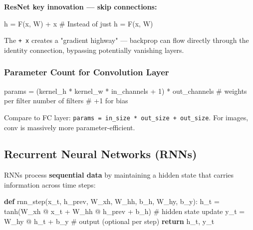 \documentclass[11pt]{article}
\newenvironment{Shaded}{\begin{snugshade}}{\end{snugshade}}
\newcommand{\CommentTok}[1]{\textcolor[rgb]{0.48,0.49,0.49}{#1}}
\newcommand{\ControlFlowTok}[1]{\textcolor[rgb]{0.99,0.74,0.29}{\textbf{#1}}}
\newcommand{\DecValTok}[1]{\textcolor[rgb]{0.96,0.45,0.00}{#1}}
\newcommand{\KeywordTok}[1]{\textcolor[rgb]{0.81,0.81,0.76}{\textbf{#1}}}
\newcommand{\NormalTok}[1]{\textcolor[rgb]{0.81,0.81,0.76}{#1}}
\newcommand{\OperatorTok}[1]{\textcolor[rgb]{0.81,0.81,0.76}{#1}}
\begin{document}
\textbf{ResNet key innovation --- skip connections:}


\begin{Shaded}
\begin{Highlighting}[]
\NormalTok{h }\OperatorTok{=}\NormalTok{ F(x, W) }\OperatorTok{+}\NormalTok{ x    }\CommentTok{\# Instead of just h = F(x, W)}
\end{Highlighting}
\end{Shaded}

The \texttt{+\ x} creates a "gradient highway" --- backprop can flow directly through the identity connection, bypassing potentially vanishing layers.

\subsubsection{Parameter Count for Convolution Layer}\label{parameter-count-for-convolution-layer}


\begin{Shaded}
\begin{Highlighting}[]
\NormalTok{params }\OperatorTok{=}\NormalTok{ (kernel\_h }\OperatorTok{*}\NormalTok{ kernel\_w }\OperatorTok{*}\NormalTok{ in\_channels }\OperatorTok{+} \DecValTok{1}\NormalTok{) }\OperatorTok{*}\NormalTok{ out\_channels}
\CommentTok{\#         weights per filter                       number of filters}
\CommentTok{\#         +1 for bias}
\end{Highlighting}
\end{Shaded}

Compare to FC layer: \texttt{params\ =\ in\_size\ *\ out\_size\ +\ out\_size}. For images, conv is massively more parameter-efficient.

\subsection{Recurrent Neural Networks (RNNs)}\label{recurrent-neural-networks-rnns}

RNNs process \textbf{sequential data} by maintaining a hidden state that carries information across time steps:


\begin{Shaded}
\begin{Highlighting}[]
\KeywordTok{def}\NormalTok{ rnn\_step(x\_t, h\_prev, W\_xh, W\_hh, b\_h, W\_hy, b\_y):}
\NormalTok{    h\_t }\OperatorTok{=}\NormalTok{ tanh(W\_xh }\OperatorTok{@}\NormalTok{ x\_t }\OperatorTok{+}\NormalTok{ W\_hh }\OperatorTok{@}\NormalTok{ h\_prev }\OperatorTok{+}\NormalTok{ b\_h)  }\CommentTok{\# hidden state update}
\NormalTok{    y\_t }\OperatorTok{=}\NormalTok{ W\_hy }\OperatorTok{@}\NormalTok{ h\_t }\OperatorTok{+}\NormalTok{ b\_y                           }\CommentTok{\# output (optional per step)}
    \ControlFlowTok{return}\NormalTok{ h\_t, y\_t}
\end{Highlighting}
\end{Shaded}
\end{document}
